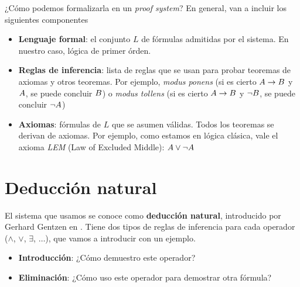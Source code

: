 ¿Cómo podemos formalizarla en un \textit{proof system}? En general, van a
incluir los siguientes componentes

\begin{itemize}
    \item \textbf{Lenguaje formal}: el conjunto $L$ de fórmulas admitidas por
    el sistema. En nuestro caso, lógica de primer órden.
    \item \textbf{Reglas de inferencia}: lista de reglas que se usan para probar
    teoremas de axiomas y otros teoremas. Por ejemplo, \textit{modus ponens} (si
    es cierto $A \rightarrow B$ y $A$, se puede concluir $B$) o
    \textit{modus tollens} (si es cierto $A \rightarrow B$ y $\neg
    B$, se puede concluir $\neg A$)
    \item \textbf{Axiomas}: fórmulas de $L$ que se asumen válidas. Todos los
    teoremas se derivan de axiomas. Por ejemplo, como estamos en lógica clásica,
    vale el axioma \textit{LEM} (Law of Excluded Middle): $A \vee \neg A$
\end{itemize}

\section{Deducción natural}

El sistema que usamos se conoce como \textbf{deducción natural}, introducido por
Gerhard Gentzen en \cite{gentzen-1935} . Tiene dos tipos de
reglas de inferencia para cada operador ($\wedge$, $\vee$, $\exists$, $\dots$),
que vamos a introducir con un ejemplo.

\begin{itemize}
    \item \textbf{Introducción}: ¿Cómo demuestro este operador?
    \item \textbf{Eliminación}: ¿Cómo uso este operador para demostrar otra fórmula?
\end{itemize}

\newcommand{\reprueba}{X}
\newcommand{\recursa}{R}
\newcommand{\falta}{F}

